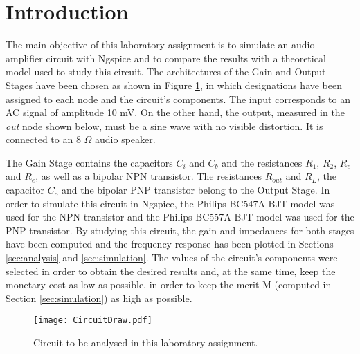 \section{Introduction} \label{sec:introduction}

The main objective of this laboratory assignment is to simulate an audio amplifier circuit with Ngspice and to compare the results with a theoretical model used to study this circuit. The architectures of the Gain and Output Stages have been chosen as shown in Figure \ref{fig:CircuitDraw}, in which designations have been assigned to each node and the circuit's components. The input corresponds to an AC signal of amplitude 10 mV. On the other hand, the output, measured in the \textit{out} node shown below,  must be a sine wave with no visible distortion. It is connected to an 8 $\Omega$ audio speaker.
\par
The Gain Stage contains the capacitors $C_i$ and $C_b$ and the resistances $R_1$, $R_2$, $R_c$ and $R_e$, as well as a bipolar NPN transistor. The resistances $R_{out}$ and $R_L$, the capacitor $C_o$ and the bipolar PNP transistor belong to the Output Stage. In order to simulate this circuit in Ngspice, the Philips BC547A BJT model was used for the NPN transistor and the Philips BC557A BJT model was used for the PNP transistor. By studying this circuit, the gain and impedances for both stages have been computed and the frequency response has been plotted in Sections \ref{sec:analysis} and \ref{sec:simulation}. The values of the circuit's components were selected in order to obtain the desired results and, at the same time, keep the monetary cost as low as possible, in order to keep the merit M (computed in Section \ref{sec:simulation}) as high as possible.

\begin{figure}[H] \centering
  \texttt{[image: CircuitDraw.pdf]}
  \caption{Circuit to be analysed in this laboratory assignment.}
  \label{fig:CircuitDraw}
\end{figure}
